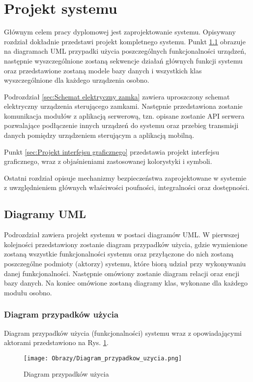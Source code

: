% 
\newpage\section{Projekt systemu \textsl{\NazwaSys}}\label{sec:projekt}
Głównym celem pracy dyplomowej jest zaprojektowanie systemu. Opisywany rozdział dokładnie przedstawi projekt kompletnego systemu. Punkt \ref{sec:Diagramy UML} obrazuje na diagramach UML przypadki użycia poszczególnych funkcjonalności urządzeń, następnie wyszczególnione zostaną sekwencje działań głównych funkcji systemu oraz przedstawione zostaną modele bazy danych i wszystkich klas wyszczególnione dla każdego urządzenia osobno. 

Podrozdział \ref{sec:Schemat elektryczny zamka} zawiera uproszczony schemat elektryczny urządzenia sterującego zamkami. Następnie przedstawiona zostanie komunikacja modułów z aplikacją serwerową, tzn. opisane zostanie API serwera pozwalające podłączenie innych urządzeń do systemu oraz przebieg transmisji danych pomiędzy urządzeniem sterującym a aplikacją mobilną.

Punkt \ref{sec:Projekt interfejsu graficznego} przedstawia projekt interfejsu graficznego, wraz z objaśnieniami zastosowanej kolorystyki i symboli.

Ostatni rozdział opisuje mechanizmy bezpieczeństwa zaprojektowane w systemie z uwzględnieniem głównych właściwości poufności, integralności oraz dostępności.

\subsection{Diagramy UML}\label{sec:Diagramy UML}
Podrozdział zawiera projekt systemu w postaci diagramów UML. W pierwszej kolejności przedstawiony zostanie diagram przypadków użycia, gdzie wymienione zostaną wszystkie funkcjonalności systemu oraz przyłączone do nich zostaną poszczególne podmioty (aktorzy) systemu, które biorą udział przy wykonywaniu danej funkcjonalności. Następnie omówiony zostanie diagram relacji oraz encji bazy danych. Na koniec omówione zostaną diagramy klas, wykonane dla każdego modułu osobno. 
	\subsubsection{Diagram przypadków użycia}
	Diagram przypadków użycia (funkcjonalności) systemu wraz z opowiadającymi aktorami przedstawiono na Rys. \ref{diagram:diagram przypadków_użycia}.
	\begin{landscape}
		\begin{figure}[!h]
			\centering
			\texttt{[image: Obrazy/Diagram\_przypadkow\_uzycia.png]}
			\caption{Diagram przypadków użycia}
			\label{diagram:diagram przypadków_użycia}
		\end{figure}
	\end{landscape}
\newpage
